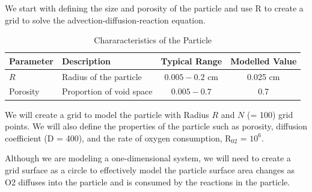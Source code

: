 \documentclass{tufte-handout}\usepackage[]{graphicx}\usepackage[]{xcolor}
\begin{document}
We start with defining the size and porosity of the particle and use R to create a grid to solve the advection-diffusion-reaction equation.

\begin{table}
\caption{Chararacteristics of the Particle}
\centering
\begin{tabular}{|l|l|c|c|} \hline
Parameter & Description & Typical Range &  Modelled Value \\ \hline\hline
\( R \) & Radius of the particle & \( 0.005-0.2 \) cm &  0.025 cm \\
Porosity & Proportion of void space & \(0.005-0.7\) &  0.7 \\ \hline
\end{tabular}
\end{table}

We will create a grid to model the particle with Radius \( R \) and \( N \) (= 100) grid points. We will also define the properties of the particle such as porosity, diffusion coefficient (D = 400), and the rate of oxygen consumption, R$_{02}$ = \ensuremath{10^{6}}.

Although we are modeling a one-dimensional system, we will need to create a grid surface as a circle to effectively model the particle surface area changes as O2 diffuses into the particle and is consumed by the reactions in the particle.
\end{document}
